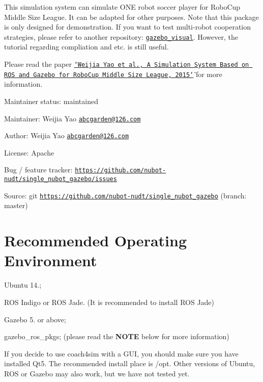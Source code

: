 This simulation system can simulate O\-N\-E robot soccer player for Robo\-Cup Middle Size League. It can be adapted for other purposes. Note that this package is only designed for demonstration. If you want to test multi-\/robot cooperation strategies, please refer to another repository\-: \href{https://github.com/nubot-nudt/gazebo_visual}{\tt gazebo\-\_\-visual}. However, the tutorial regarding compliation and etc. is still useful.

Please read the paper \href{https://www.trustie.net/organizations/23/publications}{\tt \char`\"{}\-Weijia Yao et al., A Simulation System Based on R\-O\-S and Gazebo for Robo\-Cup Middle Size League, 2015\char`\"{}} for more information.


\begin{DoxyItemize}
\item Maintainer status\-: maintained
\item Maintainer\-: Weijia Yao \href{mailto:abcgarden@126.com}{\tt abcgarden@126.\-com}
\item Author\-: Weijia Yao \href{mailto:abcgarden@126.com}{\tt abcgarden@126.\-com}
\item License\-: Apache
\item Bug / feature tracker\-: \href{https://github.com/nubot-nudt/single_nubot_gazebo/issues}{\tt https\-://github.\-com/nubot-\/nudt/single\-\_\-nubot\-\_\-gazebo/issues}
\item Source\-: git \href{https://github.com/nubot-nudt/single_nubot_gazebo}{\tt https\-://github.\-com/nubot-\/nudt/single\-\_\-nubot\-\_\-gazebo} (branch\-: master)
\end{DoxyItemize}

\section*{Recommended Operating Environment}


\begin{DoxyEnumerate}
\item Ubuntu 14.;
\item R\-O\-S Indigo or R\-O\-S Jade. (It is recommended to install R\-O\-S Jade)
\item Gazebo 5. or above;
\item gazebo\-\_\-ros\-\_\-pkgs; (please read the {\bfseries N\-O\-T\-E} below for more information)
\item If you decide to use coach4sim with a G\-U\-I, you should make sure you have installed Qt5. The recommended install place is /opt. Other versions of Ubuntu, R\-O\-S or Gazebo may also work, but we have not tested yet.
\end{DoxyEnumerate}

